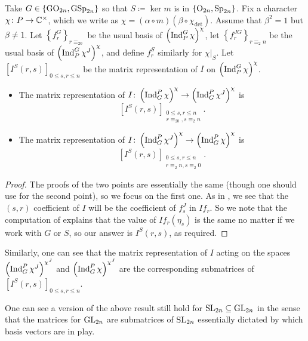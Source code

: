 \begin{lemma} \label{lem:general-from-special-matrix}
	Take $G\in\{\mathrm{GO}_{2n},\mathrm{GSp}_{2n}\}$ so that $S\coloneqq\ker m$ is in $\{\mathrm{O}_{2n},\mathrm{Sp}_{2n}\}$. Fix a character $\chi\colon P\to\mathbb C^\times$, which we write as $\chi=(\alpha\circ m)(\beta\circ\chi_{\det})$. Assume that $\beta^2=1$ but $\beta\ne1$. Let $\left\{f_r^G\right\}_{r\equiv_20}$ be the usual basis of $\left(\operatorname{Ind}_P^G\chi\right)^\chi$, let $\left\{f_r^{JG}\right\}_{r\equiv_2 n}$ be the usual basis of $\left(\operatorname{Ind}_P^G\chi^J\right)^{\chi}$, and define $f_r^S$ similarly for $\chi|_S$. Let $\left[I^S(r,s)\right]_{0\le s,r\le n}$ be the matrix representation of $I$ on $\left(\operatorname{Ind}_P^G\chi\right)^\chi$.
	\begin{itemize}
		\item The matrix representation of $I\colon\left(\operatorname{Ind}_G^P\chi\right)^\chi\to\left(\operatorname{Ind}_G^P\chi^J\right)^\chi$ is
		\[\left[I^S(r,s)\right]_{\substack{0\le s,r\le n\\r\equiv_20,s\equiv_2 n}}.\]
		\item The matrix representation of $I\colon\left(\operatorname{Ind}_G^P\chi^J\right)^\chi\to\left(\operatorname{Ind}_G^P\chi\right)^\chi$ is
		\[\left[I^S(r,s)\right]_{\substack{0\le s,r\le n\\r\equiv_2n,s\equiv_2 0}}.\]
	\end{itemize}
\end{lemma}
\begin{proof}
	The proofs of the two points are essentially the same (though one should use  for the second point), so we focus on the first one. As in , we see that the $(s,r)$ coefficient of $I$ will be the coefficient of $f_s^J$ in $If_r$. So we note that the computation of  explains that the value of $If_r(\eta_s)$ is the same no matter if we work with $G$ or $S$, so our answer is $I^S(r,s)$, as required.
\end{proof}
\begin{remark}
	Similarly, one can see that the matrix representation of $I$ acting on the spaces $\left(\operatorname{Ind}_G^P\chi^J\right)^{\chi^J}$ and $\left(\operatorname{Ind}_G^P\chi\right)^{\chi^J}$ are the corresponding submatrices of $\left[I^S(r,s)\right]_{0\le s,r\le n}$.
\end{remark}
\begin{remark}
	One can see a version of the above result still hold for $\mathrm{SL}_{2n}\subseteq\mathrm{GL}_{2n}$ in the sense that the matrices for $\mathrm{GL}_{2n}$ are submatrices of $\mathrm{SL}_{2n}$ essentially dictated by which basis vectors are in play.
\end{remark}
